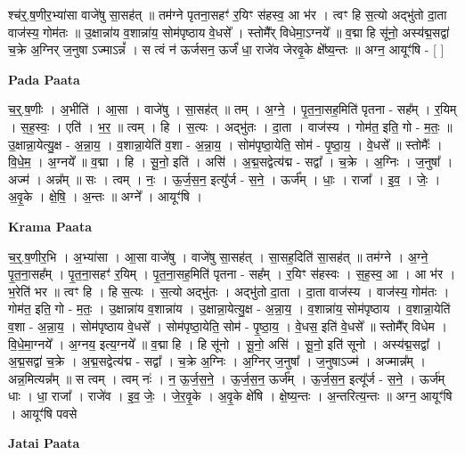 \documentclass[17pt]{extarticle}
\begin{document}
श्च॑र्॒.ष॒णीर॒भ्या॑सा वाजे॑षु सा॒सह॑त् ॥ तम॑ग्ने पृतना॒सहꣳ॑ र॒यिꣳ स॑हस्व॒ आ भ॑र । त्वꣳ हि स॒त्यो अद्भु॑तो दा॒ता वाज॑स्य॒ गोम॑तः ॥ उ॒क्षान्ना॑य व॒शान्ना॑य॒ सोम॑पृष्ठाय वे॒धसे᳚ । स्तोमै᳚र् विधेमा॒ऽग्नये᳚ ॥ व॒द्मा हि सू॑नो॒ अस्य॑द्म॒सद्वा॑ च॒क्रे अ॒ग्निर् ज॒नुषा ऽज्माऽन्नं᳚ । स त्वं न॑ ऊर्जसन॒ ऊर्जं॑ धा॒ राजे॑व जेरवृ॒के क्षे᳚ष्य॒न्तः ॥ अग्न॒ आयूꣳ॑षि - [ ] \newline

\textbf{Pada Paata} \newline

च॒र्॒.ष॒णीः । अ॒भीति॑ । आ॒सा । वाजे॑षु । सा॒सह॑त् ॥ तम् । अ॒ग्ने॒ । पृ॒त॒ना॒सह॒मिति॑ पृतना - सह᳚म् । र॒यिम् । स॒ह॒स्वः॒ । एति॑ । भ॒र॒ ॥ त्वम् । हि । स॒त्यः । अद्भु॑तः । दा॒ता । वाज॑स्य । गोम॑त॒ इति॒ गो - म॒तः॒ ॥ उ॒क्षान्ना॒येत्यु॒क्ष - अ॒न्ना॒य॒ । व॒शान्ना॒येति॑ व॒शा - अ॒न्ना॒य॒ । सोम॑पृष्ठा॒येति॒ सोम॑ - पृ॒ष्ठा॒य॒ । वे॒धसे᳚ ॥ स्तोमैः᳚ । वि॒धे॒म॒ । अ॒ग्नये᳚ ॥ व॒द्मा । हि । सू॒नो॒ इति॑ । असि॑ । अ॒द्म॒सद्वेत्य॑द्म - सद्वा᳚ । च॒क्रे । अ॒ग्निः । ज॒नुषा᳚ । अज्म॑ । अन्न᳚म् ॥ सः । त्वम् । नः॒ । ऊ॒र्ज॒स॒न॒ इत्यु᳚र्ज - स॒ने॒ । ऊर्ज᳚म् । धाः॒ । राजा᳚ । इ॒व॒ । जेः॒ । अ॒वृ॒के । क्षे॒षि॒ । अ॒न्तः ॥ अग्ने᳚ । आयूꣳ॑षि ।  \newline


\textbf{Krama Paata} \newline

च॒र्॒.ष॒णीर॒भि । अ॒भ्या॑सा । आ॒सा वाजे॑षु । वाजे॑षु सा॒सह॑त् । सा॒सह॒दिति॑ सा॒सह॑त् ॥ तम॑ग्ने । अ॒ग्ने॒ पृ॒त॒ना॒सह᳚म् । पृ॒त॒ना॒सहꣳ॑ र॒यिम् । पृ॒त॒ना॒सह॒मिति॑ पृतना - सह᳚म् । र॒यिꣳ स॑हस्वः । स॒ह॒स्व॒ आ । आ भ॑र । भ॒रेति॑ भर ॥ त्वꣳ हि । हि स॒त्यः । स॒त्यो अद्भु॑तः । अद्भु॑तो दा॒ता । दा॒ता वाज॑स्य । वाज॑स्य॒ गोम॑तः । गोम॑त॒ इति॒ गो - म॒तः॒ । उ॒क्षान्ना॑य व॒शान्ना॑य । उ॒क्षान्ना॒येत्यु॒क्ष - अ॒न्ना॒य॒ । व॒शान्ना॑य॒ सोम॑पृष्ठाय । व॒शान्ना॒येति॑ व॒शा - अ॒न्ना॒य॒ । सोम॑पृष्ठाय वे॒धसे᳚ । सोम॑पृष्ठा॒येति॒ सोम॑ - पृ॒ष्ठा॒य॒ । वे॒धस॒ इति॑ वे॒धसे᳚ ॥ स्तोमै᳚र् विधेम । वि॒धे॒मा॒ग्नये᳚ । अ॒ग्नय॒ इत्य॒ग्नये᳚ ॥ व॒द्मा हि । हि सू॑नो । सू॒नो॒ असि॑ । सू॒नो॒ इति॑ सूनो । अस्य॑द्म॒सद्वा᳚ । अ॒द्म॒सद्वा॑ च॒क्रे । अ॒द्म॒सद्वेत्य॑द्म - सद्वा᳚ । च॒क्रे अ॒ग्निः । अ॒ग्निर् ज॒नुषा᳚ । ज॒नुषाऽज्म॑ । अज्मान्न᳚म् । अन्न॒मित्यन्न᳚म् ॥ स त्वम् । त्वम् नः॑ । न॒ ऊ॒र्ज॒स॒ने॒ । ऊ॒र्ज॒स॒न॒ ऊर्ज᳚म् । ऊ॒र्ज॒स॒न॒ इत्यू᳚र्ज - स॒ने॒ । ऊर्ज॑म् धाः । धा॒ राजा᳚ । राजे॑व । इ॒व॒ जेः॒ । जे॒र॒वृ॒के । अ॒वृ॒के क्षे॑षि । क्षे॒ष्य॒न्तः । अ॒न्तरित्य॒न्तः ॥ अग्न॒ आयूꣳ॑षि । 
आयूꣳ॑षि पवसे \newline

\textbf{Jatai Paata} \newline
\end{document}
